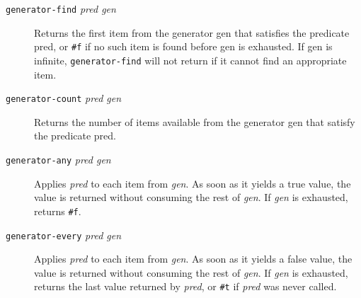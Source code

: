 \begin{description}
\item[\texttt{generator-find} \emph{pred gen}]
Returns the first item from the generator gen that satisfies the
predicate pred, or \texttt{\#f} if no such item is found before gen is
exhausted. If gen is infinite, \texttt{generator-find} will not return
if it cannot find an appropriate item.
\end{description}

\begin{description}
\item[\texttt{generator-count} \emph{pred gen}]
Returns the number of items available from the generator gen that
satisfy the predicate pred.
\end{description}

\begin{description}
\item[\texttt{generator-any} \emph{pred gen}]
Applies \emph{pred} to each item from \emph{gen}. As soon as it yields a
true value, the value is returned without consuming the rest of
\emph{gen}. If \emph{gen} is exhausted, returns \texttt{\#f}.
\end{description}

\begin{description}
\item[\texttt{generator-every} \emph{pred gen}]
Applies \emph{pred} to each item from \emph{gen}. As soon as it yields a
false value, the value is returned without consuming the rest of
\emph{gen}. If \emph{gen} is exhausted, returns the last value returned
by \emph{pred}, or \texttt{\#t} if \emph{pred} was never called.
\end{description}

